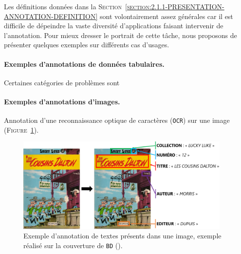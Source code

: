 			Les définitions données dans la \textsc{Section~\ref{section:2.1.1-PRESENTATION-ANNOTATION-DEFINITION}} sont volontairement assez générales car il est difficile de
			dépeindre la vaste diversité d'applications faisant intervenir de l'annotation.
			Pour mieux dresser le portrait de cette tâche, nous proposons de présenter quelques exemples sur différents cas d'usages.
			
			\paragraph{Exemples d'annotations de données tabulaires.}
				Certaines catégories de problèmes sont 
			
			\paragraph{Exemples d'annotations d'images.}
				
				
				\begin{leftBarExamples}
					Annotation d'une reconnaissance optique de caractères (\texttt{OCR}) sur une image (\textsc{Figure~\ref{figure:2.1.2-PRESENTATION-ANNOTATION-EXEMPLES-IMAGE-OCR}}).
					\begin{figure}[H]
						\centering
						\includegraphics[width=0.95\textwidth]{figures/etatdelart-morris-1958-lucky-luke-12}
						\caption{
							Exemple d'annotation de textes présents dans une image, exemple réalisé sur la couverture de \texttt{BD} (\cite{morris-goscinny:1958:cousins-dalton}).
						}
						\label{figure:2.1.2-PRESENTATION-ANNOTATION-EXEMPLES-IMAGE-OCR}
					\end{figure}
				\end{leftBarExamples}
			
